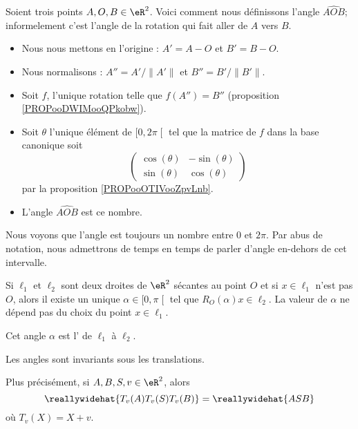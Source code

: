 \begin{definition}      \label{DEFooUPUUooKAPFrh}
    Soient trois points \( A,O,B\in \eR^2\). Voici comment nous définissons l'angle \( \widehat{AOB}\); informelement c'est l'angle de la rotation qui fait aller de \( A\) vers \( B\).
    \begin{itemize}
        \item Nous nous mettons en l'origine : \( A'=A-O\) et \( B'=B-O\).
        \item Nous normalisons : \( A''=A'/\| A' \|\) et \( B''=B'/\| B' \|\).
        \item Soit \( f\), l'unique rotation telle que \( f(A'')=B''\) (proposition \ref{PROPooDWIMooQPkobw}).
        \item Soit \( \theta\) l'unique élément de \( \mathopen[ 0 , 2\pi \mathclose[\) tel que la matrice de \( f\) dans la base canonique soit
    \begin{equation}
        \begin{pmatrix}
            \cos(\theta)    &   -\sin(\theta)    \\
            \sin(\theta)    &   \cos(\theta)
        \end{pmatrix}
    \end{equation}
    par la proposition \ref{PROPooOTIVooZpvLnb}.
\item L'angle \( \widehat{AOB}\) est ce nombre.
    \end{itemize}
\end{definition}

Nous voyons que l'angle est toujours un nombre entre \( 0\) et \( 2\pi\). Par abus de notation, nous admettrons de temps en temps de parler d'angle en-dehors de cet intervalle.

\begin{lemmaDef}        \label{DEFooEGKOooRPGOAs}
    Si \( \ell_1\) et \( \ell_2\) sont deux droites de \( \eR^2\) sécantes au point \( O\) et si \( x\in\ell_1\) n'est pas \( O\), alors il existe un unique \( \alpha\in \mathopen[ 0 , \pi \mathclose[\) tel que \( R_O(\alpha)x\in \ell_2\). La valeur de \( \alpha\) ne dépend pas du choix du point \( x\in \ell_1\).

        Cet angle \( \alpha\) est l' de \( \ell_1\) à \( \ell_2\).
\end{lemmaDef}


\begin{proposition}      \label{PROPooKVSHooRODGWE}
    Les angles sont invariants sous les translations. 

    Plus précisément, si \( A,B,S,v\in \eR^2\), alors
    \begin{equation}
        \reallywidehat{T_v(A)T_v(S)T_v(B)}=\reallywidehat{ASB}
    \end{equation}
    où \( T_v(X)=X+v\).
\end{proposition}

